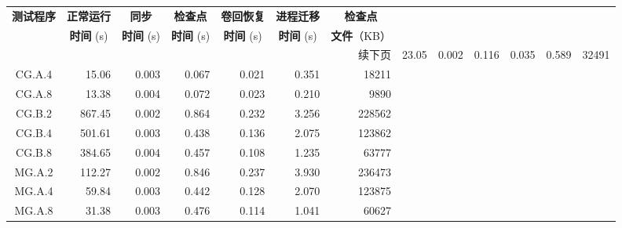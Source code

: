 \begin{ThreePartTable}
\begin{longtable}[c]{c*{6}{r}}
    \toprule
    \textbf{测试程序\tnote{b}} & \multicolumn{1}{c}{\textbf{正常运行}}   & \multicolumn{1}{c}{\textbf{同步}}
                           & \multicolumn{1}{c}{\textbf{检查点}}    & \multicolumn{1}{c}{\textbf{卷回恢复}}
                           & \multicolumn{1}{c}{\textbf{进程迁移}}   & \multicolumn{1}{c}{\textbf{检查点}}                                              \\
                           & \multicolumn{1}{c}{\textbf{时间} (s)} & \multicolumn{1}{c}{\textbf{时间} (s)}
                           & \multicolumn{1}{c}{\textbf{时间} (s)} & \multicolumn{1}{c}{\textbf{时间} (s)}
                           & \multicolumn{1}{c}{\textbf{时间} (s)} & \textbf{文件}（KB）                                                               \\
    \midrule
    \endhead
    \hline
    \multicolumn{7}{r}{续下页}
    \endfoot
    \insertTableNotes
    \endlastfoot
    CG.C.2                 & 23.05                               & 0.002                               & 0.116          & 0.035 & 0.589 & 32491  \\
    CG.A.4                 & 15.06                               & 0.003                               & 0.067          & 0.021 & 0.351 & 18211  \\
    CG.A.8                 & 13.38                               & 0.004                               & 0.072          & 0.023 & 0.210 & 9890   \\
    CG.B.2                 & 867.45                              & 0.002                               & 0.864          & 0.232 & 3.256 & 228562 \\
    CG.B.4                 & 501.61                              & 0.003                               & 0.438          & 0.136 & 2.075 & 123862 \\
    CG.B.8                 & 384.65                              & 0.004                               & 0.457          & 0.108 & 1.235 & 63777  \\
    MG.A.2                 & 112.27                              & 0.002                               & 0.846\tnote{a} & 0.237 & 3.930 & 236473 \\
    MG.A.4                 & 59.84                               & 0.003                               & 0.442          & 0.128 & 2.070 & 123875 \\
    MG.A.8                 & 31.38                               & 0.003                               & 0.476          & 0.114 & 1.041 & 60627  \\

\end{longtable}
\end{ThreePartTable}
